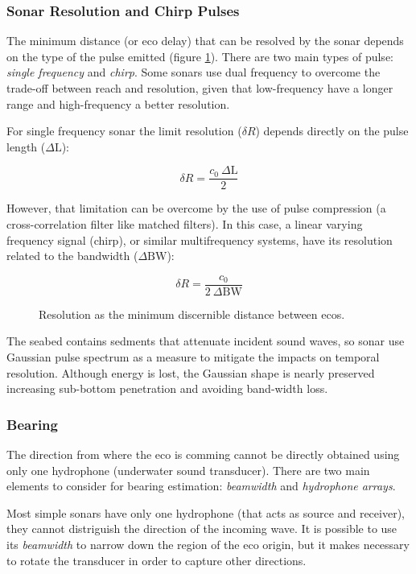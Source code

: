 \subsubsection{Sonar Resolution and Chirp Pulses}

The minimum distance (or eco delay) that can be resolved by the sonar depends on
the type of the pulse emitted (figure \ref{fig:chirpresolution}). There are two
main types of pulse:
\textit{single frequency} and \textit{chirp}\cite{chirp,gaussianchirp}. Some
sonars use dual frequency to overcome the trade-off between reach and resolution, given that low-frequency have a longer
range and high-frequency a better resolution.

For single frequency sonar the limit resolution ($\delta R$) depends directly on
the pulse length ($\Delta\text{L}$):

\[ \delta R = \frac{c_0~\Delta\text{L}}{2} \] 

However, that limitation can be overcome by the use of pulse compression (a
cross-correlation filter like matched filters). In this case, a linear varying
frequency signal (chirp), or similar multifrequency systems, have its resolution
related to the bandwidth ($\Delta \text{BW}$):

\[ \delta R = \frac{c_0}{2~\Delta \text{BW}} \]

\begin{figure}
	\centering
	
	\caption{Resolution as the minimum discernible distance between ecos.}
	\label{fig:chirpresolution}
\end{figure}

The seabed contains sedments that attenuate incident sound waves, so sonar use
Gaussian pulse spectrum as a measure to mitigate the impacts on temporal
resolution. Although energy is lost, the Gaussian shape is nearly preserved
increasing sub-bottom penetration and avoiding band-width loss.

\subsubsection{Bearing}
\label{sss:bearing}

The direction from where the eco is comming cannot be directly obtained using
only one hydrophone (underwater sound transducer). There are two main elements
to consider for bearing estimation: \textit{beamwidth} and \textit{hydrophone
arrays}.

Most simple sonars have only one hydrophone (that acts as source and receiver),
they cannot distriguish the direction of the incoming wave. It is possible
to use its \textit{beamwidth} to narrow down the region of the eco origin, but
it makes necessary to rotate the transducer in order to capture other
directions.

